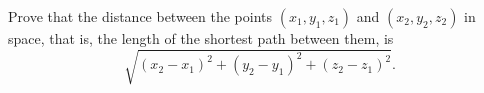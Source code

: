 Prove that the distance between the points $(x_1,y_1,z_1)$ and $(x_2,y_2,z_2)$ in space, that is, the length of the shortest path between them, is
\[\sqrt{(x_2-x_1)^2+(y_2-y_1)^2+(z_2-z_1)^2}.\]
